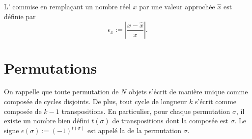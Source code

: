 \begin{definition}
	L' commise en remplaçant un nombre réel $x$ par une valeur approchée $\hat{x}$ est définie par 
	\begin{equation}
		\epsilon_x:=\left|\frac{x-\hat{x}}{x}\right|.
	\end{equation}
\end{definition}

\section{Permutations}

On rappelle que toute permutation de $N$ objets s'écrit de manière unique comme composée de cycles disjoints. De plus, tout cycle de longueur $k$ s'écrit comme composée de $k-1$ transpositions. En particulier, pour chaque permutation $\sigma$,  il existe un nombre bien défini $t(\sigma)$ de transpositions dont la composée est $\sigma$. Le signe $\epsilon(\sigma):=(-1)^{t(\sigma)}$ est appelé la  de la permutation $\sigma$.

